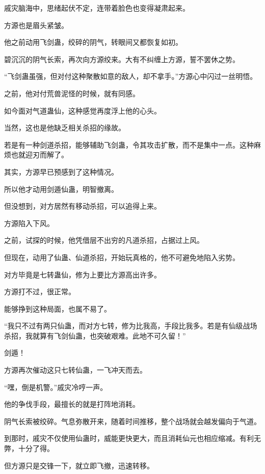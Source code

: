 
\begin{this_body}



戚灾脑海中，思绪起伏不定，连带着脸色也变得凝肃起来。

方源也是眉头紧皱。

他之前动用飞剑蛊，绞碎的阴气，转眼间又都恢复如初。

碧沉沉的阴气长索，再次向方源绞来。大有不纠缠上方源，誓不罢休之势。

“飞剑蛊虽强，但对付这种聚散如意的敌人，却不拿手。”方源心中闪过一丝明悟。

之前，他对付荒兽泥怪的时候，就有同感。

如今面对气道蛊仙，这种感觉再度浮上他的心头。

当然，这也是他缺乏相关杀招的缘故。

若是有一种剑道杀招，能够辅助飞剑蛊，令其攻击扩散，而不是集中一点。这种麻烦也就迎刃而解了。

其实，方源早已预感到了这种情况。

所以他才动用剑遁仙蛊，明智撤离。

但没想到，对方居然有移动杀招，可以追得上来。

方源陷入下风。

之前，试探的时候，他凭借层不出穷的凡道杀招，占据过上风。

但现在，动用了仙蛊、仙道杀招，开始玩真格的，他不可避免地陷入劣势。

对方毕竟是七转蛊仙，修为上要比方源高出许多。

方源打不过，很正常。

能够挣到这种局面，也属不易了。

“我只不过有两只仙蛊，而对方七转，修为比我高，手段比我多。若是有仙级战场杀招，我就算有飞剑仙蛊，也突破艰难。此地不可久留！”

剑遁！

方源再次催动这只七转仙蛊，一飞冲天而去。

“嘿，倒是机警。”戚灾冷哼一声。

他的争伐手段，最擅长的就是打阵地消耗。

阴气长索被绞碎。气息弥散开来，随着时间推移，整个战场就会越发偏向于气道。

到那时，戚灾不仅使用仙蛊时，威能更快更大，而且消耗仙元也相应缩减。有利无弊，十分了得。

但方源只是交锋一下，就立即飞撤，迅速转移。


\end{this_body}
